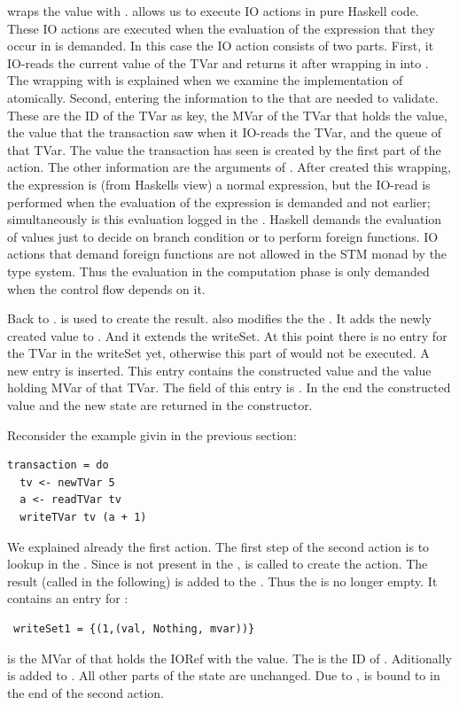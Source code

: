  wraps
the value with .  allows us to execute IO actions in pure
Haskell code. These IO actions are executed when the evaluation of the expression that they occur in 
is demanded. In this case the IO action consists of two parts. First, it IO-reads the 
current value of the TVar and returns it after wrapping in into . The wrapping with 
 is explained when we examine the implementation of atomically. Second, entering the 
information to the  that are needed to validate. These are the ID of the TVar as 
key, the MVar of the TVar that holds the value, the value that the transaction saw when it IO-reads
the TVar, and the queue of that TVar. The value the transaction has seen is created by the first 
part of the  action. The other information are the arguments of . After 
created this wrapping, the expression is (from Haskells view) a normal expression, but the IO-read is
performed when the evaluation of the expression is demanded and not earlier; simultaneously is this 
evaluation logged in the . Haskell demands the evaluation of values just to decide on
branch condition or to perform foreign functions. IO actions that demand foreign functions are not allowed in the STM monad by the type
system. Thus the evaluation in the computation phase is only demanded when the control flow depends 
on it. 

Back to .  is used to create the result.  also modifies the 
the . It adds the newly created value to . And it extends the writeSet.
At this point there is no entry for the TVar in the writeSet yet, otherwise this part of 
would not be executed. A new entry is inserted. This entry contains the constructed value and 
the value holding MVar of that TVar. The  field of this entry is .
In the end the constructed value and the new state are returned in the  constructor.

Reconsider the example givin in the previous section:
\begin{lstlisting}
transaction = do 
  tv <- newTVar 5
  a <- readTVar tv
  writeTVar tv (a + 1)
\end{lstlisting}
We explained already the first action. The first step of the second action is to lookup 
in the . Since  is not present in the ,  is
called to create the  action. The result (called  in the 
following) is added to the . Thus the  is no longer empty. It contains 
an entry for :
\begin{lstlisting}
 writeSet1 = {(1,(val, Nothing, mvar))}
\end{lstlisting}
 is the MVar of  that holds the IORef with the value. The  is the
ID of . Aditionally is  
added to . All other parts of the state are unchanged. Due to \code{<-},  is 
bound to  in the end of the second action. 


